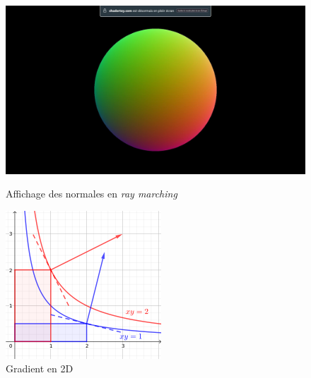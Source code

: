\begin{figure}[h]
  \begin{minipage}[b]{0.45\linewidth}
    \centering
    \includegraphics[width=\linewidth]{images/shaders/shaderatelier_08.jpg}
    \caption{Affichage des normales en \textit{ray marching}}
    \label{meduse_02}
  \end{minipage}
  \hspace{0.1\linewidth} %
  \begin{minipage}[b]{0.45\linewidth}
    \centering
    \includegraphics[width=\linewidth]{images/shaders/grad01.png}
    \caption{Gradient en 2D}
    \label{grad01}
  \end{minipage}
\end{figure}



